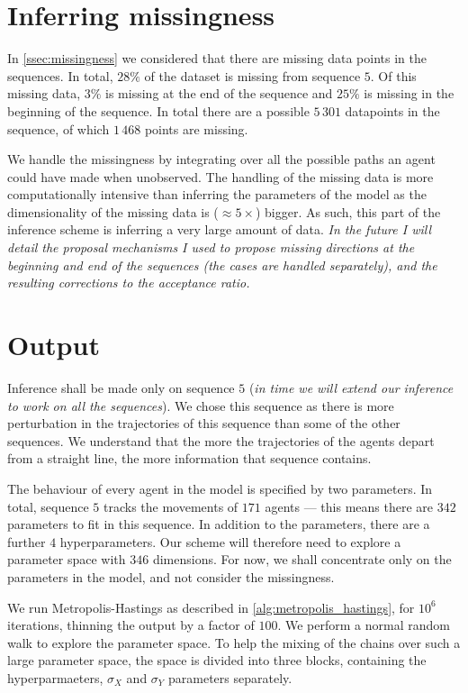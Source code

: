 \section{Inferring missingness}
\label{ssec:vicsek_paths}


In \cref{ssec:missingness} we considered that there are missing data points in the sequences. In total, $28\%$ of the dataset is missing from sequence $5$. Of this missing data, $3\%$ is missing at the end of the sequence and $25\%$ is missing in the beginning of the sequence. In total there are a possible $5\,301$ datapoints in the sequence, of which $1\,468$ points are missing.

We handle the missingness by integrating over all the possible paths an agent could have made when unobserved. The handling of the missing data is more computationally intensive than inferring the parameters of the model as the dimensionality of the missing data is ($\approx 5 \times$) bigger. As such, this part of the inference scheme is inferring a very large amount of data. \emph{In the future I will detail the proposal mechanisms I used to propose missing directions at the beginning and end of the sequences (the cases are handled separately), and the resulting corrections to the acceptance ratio.}

\section{Output}
\label{ssec:vicsek_params}

Inference shall be made only on sequence $5$ (\emph{in time we will extend our inference to work on all the sequences}). We chose this sequence as there is more perturbation in the trajectories of this sequence than some of the other sequences. We understand that the more the trajectories of the agents depart from a straight line, the more information that sequence contains.

The behaviour of every agent in the model is specified by two parameters. In total, sequence $5$ tracks the movements of $171$ agents --- this means there are $342$ parameters to fit in this sequence. In addition to the parameters, there are a further $4$ hyperparameters. Our scheme will therefore need to explore a parameter space with $346$ dimensions. For now, we shall concentrate only on the parameters in the model, and not consider the missingness.

We run Metropolis-Hastings as described in \cref{alg:metropolis_hastings}, for $10^6$ iterations, thinning the output by a factor of $100$. We perform a normal random walk to explore the parameter space. To help the mixing of the chains over such a large parameter space, the space is divided into three blocks, containing the hyperparmaeters, $\sigma_X$ and $\sigma_Y$ parameters separately.

